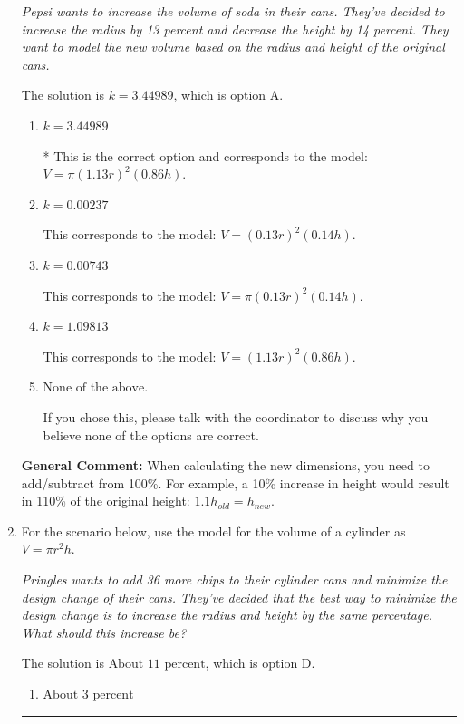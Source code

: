 \documentclass{extbook}[14pt]
\newcommand{\litem}[1]{\item #1

\rule{\textwidth}{0.4pt}}
\begin{document}
\begin{enumerate}
{\begin{center}
    \textit{ Pepsi wants to increase the volume of soda in their cans. They've decided to increase the radius by 13 percent and decrease the height by 14 percent. They want to model the new volume based on the radius and height of the original cans. }
\end{center}


The solution is \( k = 3.44989 \), which is option A.\begin{enumerate}[label=\Alph*.]
\item \( k = 3.44989 \)

* This is the correct option and corresponds to the model: $V = \pi (1.13 r)^2 (0.86 h)$.
\item \( k = 0.00237 \)

This corresponds to the model: $V = (0.13 r)^2 (0.14 h)$.
\item \( k = 0.00743 \)

This corresponds to the model: $V = \pi (0.13 r)^2 (0.14 h)$.
\item \( k = 1.09813 \)

This corresponds to the model: $V = (1.13 r)^2 (0.86 h)$.
\item \( \text{None of the above.} \)

If you chose this, please talk with the coordinator to discuss why you believe none of the options are correct.
\end{enumerate}

\textbf{General Comment:} When calculating the new dimensions, you need to add/subtract from 100\%. For example, a 10\% increase in height would result in 110\% of the original height: $1.1h_{old} = h_{new}$.
}
\litem{
For the scenario below, use the model for the volume of a cylinder as $V = \pi r^2 h$.

\begin{center}
    \textit{ Pringles wants to add 36 \text{percent} more chips to their cylinder cans and minimize the design change of their cans. They've decided that the best way to minimize the design change is to increase the radius and height by the same percentage. What should this increase be? }
\end{center}


The solution is \( \text{About } 11 \text{ percent} \), which is option D.\begin{enumerate}[label=\Alph*.]
\item \( \text{About } 3 \text{ percent} \)


\end{enumerate}}
\end{enumerate}
\end{document}
